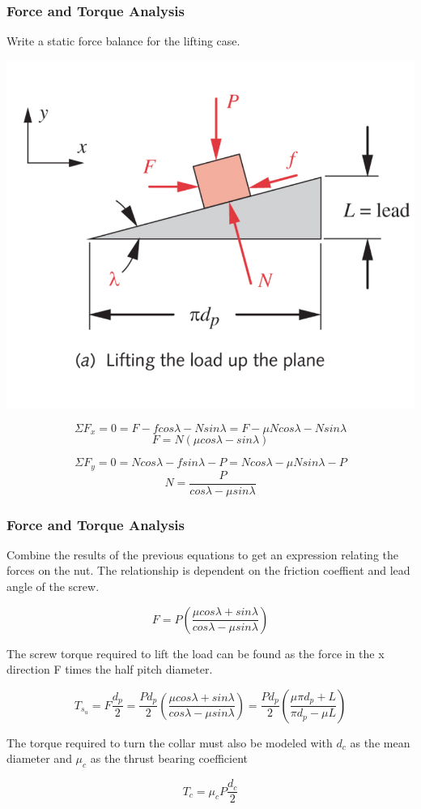 \documentclass[fleqn]{beamer} %
\newcommand{\sectiontitleIII}{Force and Torque Analysis}
\begin{document}
	\begin{frame}[label=sectionIII] \footnotesize
		\frametitle{\sectiontitleIII}
		
		\begin{multicols}{2}
			Write a static force balance for the lifting case.

			\includegraphics[scale=.12]{images/figure_15_6_a.png}
		\end{multicols}

			\[\Sigma F_x = 0 = F - f cos\lambda -N sin\lambda = F - \mu N cos\lambda - N sin\lambda \]	
			\[F=N(\mu cos\lambda-sin\lambda)\]	

			\[\Sigma F_y = 0 = N cos\lambda - f sin\lambda - P = N cos\lambda -\mu N sin\lambda - P \]
			\[N=\frac{P}{cos\lambda - \mu sin\lambda}\]
	        
	\end{frame}  

	\begin{frame}[label=sectionIII] \footnotesize
		\frametitle{\sectiontitleIII}
	 		
		Combine the results of the previous equations to get an expression relating the forces on the nut. The relationship is dependent on the friction coeffient and lead angle of the screw. 

		\[F = P \left( \frac{\mu cos\lambda +sin\lambda}{cos\lambda - \mu sin \lambda} \right)\]
		
		The screw torque required to lift the load can be found as the force in the x direction F times the half pitch diameter.  	

		\[T_{s_u} = F \frac{d_p}{2} = \frac{Pd_p}{2} \left( \frac{\mu cos\lambda +sin\lambda}{cos\lambda - \mu sin \lambda} \right) =  \frac{Pd_p}{2}\left(\frac{\mu \pi d_p +L}{\pi d_p -\mu L} \right) \] 

		The torque required to turn the collar must also be modeled with $d_c$ as the mean diameter and $\mu_c$ as the thrust bearing coefficient

		\[T_c=\mu_cP\frac{d_c}{2}\]

	\end{frame}  
\end{document}
